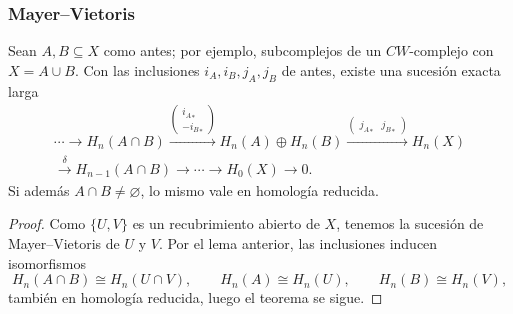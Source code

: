 \begin{frame}[allowframebreaks]
  \frametitle{Mayer--Vietoris}

  \begin{theorem}
    Sean $A,B\subseteq X$ como antes; por ejemplo, subcomplejos de un
    $CW$-complejo con $X=A\cup B$. Con las inclusiones $i_A,i_B,j_A,j_B$ de
    antes, existe una sucesión exacta larga
    \begin{multline*}
      \cdots\to H_n(A\cap B)\xrightarrow{\left(\begin{smallmatrix}{i_A}_*\\-{i_B}_*\end{smallmatrix}\right)}H_n(A)\oplus H_n(B)
      \xrightarrow{\left(\begin{smallmatrix}{j_A}_* & {j_B}_*\end{smallmatrix}\right)}H_n(X)\\
      \xrightarrow{\ \delta\ }H_{n-1}(A\cap B)\to\cdots\to H_0(X)\to0.
    \end{multline*}
    Si además $A\cap B\neq\varnothing$, lo mismo vale en homología reducida.
  \end{theorem}

  \framebreak

  \begin{proof}
    Como $\{U,V\}$ es un recubrimiento abierto de $X$, tenemos la sucesión
    de Mayer--Vietoris de $U$ y $V$. Por el
    lema anterior, las inclusiones inducen isomorfismos
    \[
      H_n(A\cap B)\cong H_n(U\cap V),\qquad
      H_n(A)\cong H_n(U),\qquad
      H_n(B)\cong H_n(V),
    \]
    también en homología reducida, 
    luego el teorema se sigue.
  \end{proof}
\end{frame}
